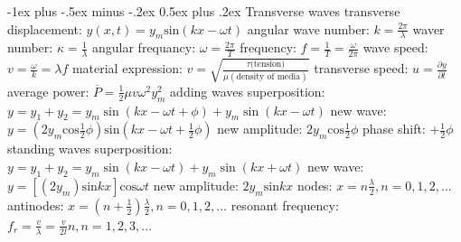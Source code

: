 \documentclass[10pt,landscape]{article}
\makeatletter
\renewcommand{\subsection}{\@startsection{subsection}{2}{0mm}%
                                {-1ex plus -.5ex minus -.2ex}%
                                {0.5ex plus .2ex}%
                                {\normalfont\normalsize\bfseries}}
\newcommand{\spc}{\hspace*{1em}}
\makeatother
\begin{document}
\begin{multicols*}{3}
\subsection{Transverse waves}
transverse displacement: $y(x,t)=y_m\mathrm{sin}(kx-\omega t)$
\newline
\spc angular wave number: $k=\frac{2\pi }{\lambda }$
\newline
\spc waver number: $\kappa =\frac{1}{\lambda }$
\newline
\spc angular frequancy: $\omega =\frac{2 \pi}{T}$
\newline
\spc frequency: $f=\frac{1}{T}=\frac{\omega }{2 \pi}$
\newline
\spc wave speed: $v=\frac{\omega }{k}=\lambda f$
\newline
\spc \spc material expression: $v=\sqrt{\frac{\tau \textrm{(tension)}}{\mu (\textrm{density of media})}}$
\newline
\spc transverse speed: $u=\frac{\partial y}{\partial t}$
\newline
\spc average power: $\overline{P}=\frac{1}{2}\mu v\omega ^2y_m^2$
\newline \newline 
adding waves
\newline
\spc superposition: $y=y_1+y_2=y_m\sin (kx-\omega t+\phi)+y_m\sin (kx-\omega t)$
\newline
\spc new wave: $y=(2y_m\mathrm{cos}\frac{1}{2}\phi)\mathrm{sin}(kx-\omega t+\frac{1}{2}\phi)$
\newline
\spc new amplitude: $2y_m\mathrm{cos}\frac{1}{2}\phi$
\newline
\spc phase shift: $+\frac{1}{2}\phi$
\newline
\newline
standing waves
\newline
\spc superposition: $y=y_1+y_2=y_m \sin (kx-\omega t)+y_m \sin (kx+\omega t)$
\newline
\spc new wave: $y=[(2y_m)\mathrm{sin}kx]\mathrm{cos}\omega t$
\newline
\spc new amplitude: $2y_m\mathrm{sin}kx$
\newline
\spc nodes: $x=n\frac{\lambda }{2}, n=0,1,2,...$
\newline
\spc antinodes: $x=(n+\frac{1}{2})\frac{\lambda }{2}, n=0,1,2,...$
\newline
\spc resonant frequency: $f_r=\frac{v}{\lambda }=\frac{v}{2l}n, n=1,2,3,...$


\end{multicols*}
\end{document}
